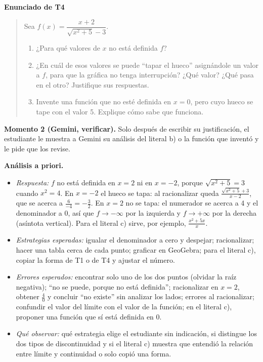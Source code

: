 \documentclass[11pt,letterpaper]{article}
\newenvironment{tarea}[1]{\par\medskip\noindent\textbf{Enunciado de #1}\begin{quote}}{\end{quote}}
\begin{document}
\begin{tarea}{T4}
Sea $f(x)=\dfrac{x+2}{\sqrt{x^2+5}-3}$.
\begin{enumerate}[label=\alph*)]
  \item ¿Para qué valores de $x$ no está definida $f$?
  \item ¿En cuál de esos valores se puede ``tapar el hueco'' asignándole un valor a $f$, para que la gráfica no tenga interrupción? ¿Qué valor? ¿Qué pasa en el otro? Justifique sus respuestas.
  \item Invente una función que no esté definida en $x=0$, pero cuyo hueco se tape con el valor 5. Explique cómo sabe que funciona.
\end{enumerate}
\end{tarea}

\textbf{Momento 2 (Gemini, verificar).} Solo después de escribir su justificación, el estudiante le muestra a Gemini su análisis del literal b) o la función que inventó y le pide que los revise.

\textbf{Análisis a priori.}
\begin{itemize}
  \item \emph{Respuesta:} $f$ no está definida en $x=2$ ni en $x=-2$, porque $\sqrt{x^2+5}=3$ cuando $x^2=4$. En $x=-2$ el hueco se tapa: al racionalizar queda $\frac{\sqrt{x^2+5}+3}{x-2}$, que se acerca a $\frac{6}{-4}=-\frac32$. En $x=2$ no se tapa: el numerador se acerca a 4 y el denominador a 0, así que $f\to-\infty$ por la izquierda y $f\to+\infty$ por la derecha (asíntota vertical). Para el literal c) sirve, por ejemplo, $\frac{x^2+5x}{x}$.
  \item \emph{Estrategias esperadas:} igualar el denominador a cero y despejar; racionalizar; hacer una tabla cerca de cada punto; graficar en GeoGebra; para el literal c), copiar la forma de T1 o de T4 y ajustar el número.
  \item \emph{Errores esperados:} encontrar solo uno de los dos puntos (olvidar la raíz negativa); ``no se puede, porque no está definida''; racionalizar en $x=2$, obtener $\frac{4}{0}$ y concluir ``no existe'' sin analizar los lados; errores al racionalizar; confundir el valor del límite con el valor de la función; en el literal c), proponer una función que sí está definida en 0.
  \item \emph{Qué observar:} qué estrategia elige el estudiante sin indicación, si distingue los dos tipos de discontinuidad y si el literal c) muestra que entendió la relación entre límite y continuidad o solo copió una forma.
\end{itemize}
\end{document}

